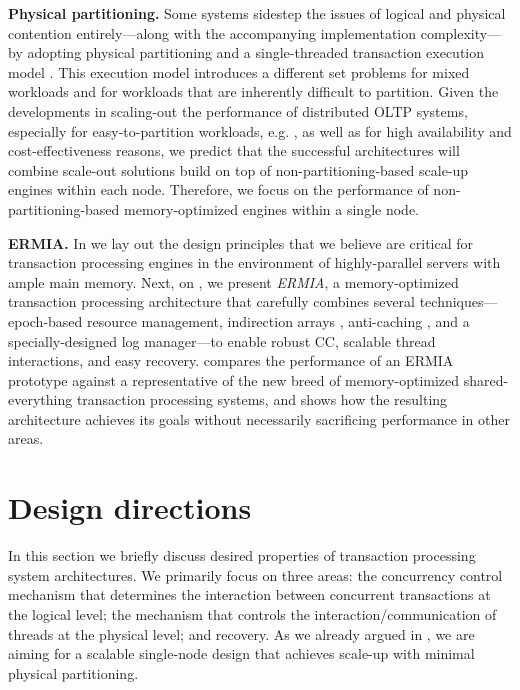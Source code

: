 \vspace{2mm}
{\bf Physical partitioning.} Some systems sidestep the issues of logical and physical contention entirely---along with the accompanying implementation complexity---by adopting physical partitioning and a single-threaded transaction execution model \cite{Kallman+08,KemperN11}. This execution model introduces a different set problems for mixed workloads and for workloads that are inherently difficult to partition.  Given the developments in scaling-out the performance of distributed OLTP systems, especially for easy-to-partition workloads, e.g. \cite{Corbett+12,BailisFHGS14,ThomsonA10}, as well as for high availability and cost-effectiveness reasons, we predict that the successful architectures will combine scale-out solutions build on top of non-partitioning-based scale-up engines within each node.
Therefore, we focus on the performance of non-partitioning-based memory-optimized engines within a single node.

\vspace{2mm}
{\bf ERMIA.} 
In  we lay out the design principles that we believe are critical for transaction processing engines in the environment of highly-parallel servers with ample main memory. Next, on , we present {\em ERMIA}, a memory-optimized transaction processing architecture that carefully combines several techniques---epoch-based resource management, indirection arrays \cite{SadoghiRCB13}, anti-caching \cite{DeBrabantPTSZ13}, and a specially-designed log manager---to enable robust CC, scalable thread interactions, and easy recovery.  
 compares the performance of an ERMIA prototype against a representative of the new breed of memory-optimized shared-everything transaction processing systems, and shows how the resulting architecture achieves its goals without necessarily sacrificing performance in other areas.


\section{Design directions}

In this section we briefly discuss desired properties of transaction processing system architectures. We primarily focus on three areas: the concurrency control mechanism that determines the interaction between concurrent transactions at the logical level; the mechanism that controls the interaction/communication of threads at the physical level; and recovery. As we already argued in , we are aiming for a scalable single-node design that achieves scale-up with minimal physical partitioning.  

